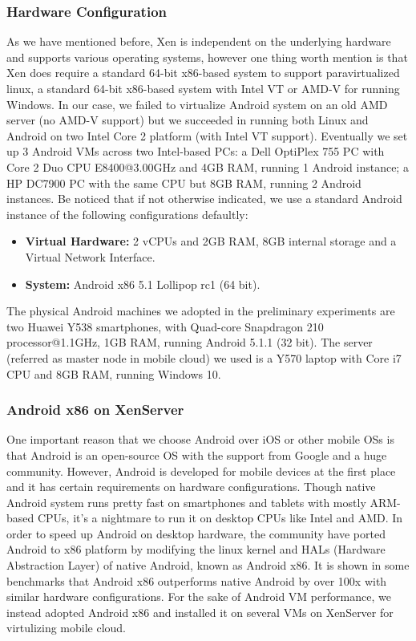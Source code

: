 \documentclass[journal,comsoc]{IEEEtran}
\begin{document}
\subsubsection{Hardware Configuration}
As we have mentioned before, Xen is independent on the underlying hardware and supports various operating systems, however one thing worth mention is that Xen does require a standard 64-bit x86-based system to support paravirtualized linux, a standard 64-bit x86-based system with Intel VT or AMD-V for running Windows. In our case, we failed to virtualize Android system on an  old AMD server (no AMD-V support) but we succeeded in running both Linux and Android on two Intel Core 2 platform (with Intel VT support). Eventually we set up 3 Android VMs across two Intel-based PCs: a Dell OptiPlex 755 PC with Core 2 Duo CPU E8400@3.00GHz and 4GB RAM, running 1 Android instance; a HP DC7900 PC with the same CPU but 8GB RAM, running 2 Android instances. Be noticed that if not otherwise indicated, we use a standard Android instance of the following configurations defaultly:
\begin{itemize}
	\item {\bf Virtual Hardware: }2 vCPUs and 2GB RAM, 8GB internal storage and a Virtual Network Interface.
	\item {\bf System: }Android x86 5.1 Lollipop rc1 (64 bit).
\end{itemize}

The physical Android machines we adopted in the preliminary experiments are two Huawei Y538 smartphones, with Quad-core Snapdragon 210 processor@1.1GHz, 1GB RAM, running Android 5.1.1 (32 bit). The server (referred as master node in mobile cloud) we used is a Y570 laptop with Core i7 CPU and 8GB RAM, running Windows 10.

\subsubsection{Android x86 on XenServer}
One important reason that we choose Android over iOS or other mobile OSs is that Android is an open-source OS with the support from Google and a huge community. However, Android is developed for mobile devices at the first place and it has certain requirements on hardware configurations. Though native Android system runs pretty fast on smartphones and tablets with mostly ARM-based CPUs, it's a nightmare to run it on desktop CPUs like Intel and AMD. In order to speed up Android on desktop hardware, the community have ported Android to x86 platform by modifying the linux kernel and HALs (Hardware Abstraction Layer) of native Android, known as Android x86\cite{android-x86}. It is shown in some benchmarks that Android x86 outperforms native Android by over 100x with similar hardware configurations\cite{android_x86_bench}. For the sake of Android VM performance, we instead adopted Android x86 and installed it on several VMs on XenServer for virtulizing mobile cloud.
\end{document}
